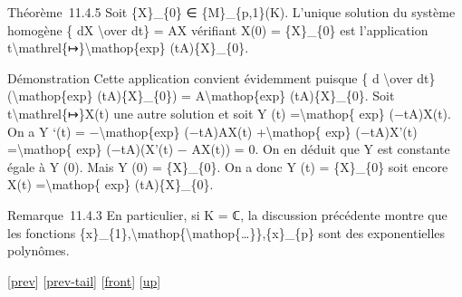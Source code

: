 \documentclass[]{article}
\begin{document}
Théorème~11.4.5 Soit \{X\}\_\{0\} ∈ \{M\}\_\{p,1\}(K). L'unique solution
du système homogène \{ dX \textbackslash{}over dt\} = AX vérifiant X(0)
= \{X\}\_\{0\} est l'application
t\textbackslash{}mathrel\{↦\}\textbackslash{}mathop\{exp\}
(tA)\{X\}\_\{0\}.

Démonstration Cette application convient évidemment puisque \{ d
\textbackslash{}over dt\} (\textbackslash{}mathop\{exp\}
(tA)\{X\}\_\{0\}) = A\textbackslash{}mathop\{exp\} (tA)\{X\}\_\{0\}.
Soit t\textbackslash{}mathrel\{↦\}X(t) une autre solution et soit Y (t)
=\textbackslash{}mathop\{ exp\} (−tA)X(t). On a Y `(t) =
−\textbackslash{}mathop\{exp\} (−tA)AX(t) +\textbackslash{}mathop\{
exp\} (−tA)X'(t) =\textbackslash{}mathop\{ exp\} (−tA)(X'(t) − AX(t)) =
0. On en déduit que Y est constante égale à Y (0). Mais Y (0) =
\{X\}\_\{0\}. On a donc Y (t) = \{X\}\_\{0\} soit encore X(t)
=\textbackslash{}mathop\{ exp\} (tA)\{X\}\_\{0\}.

Remarque~11.4.3 En particulier, si K = ℂ, la discussion précédente
montre que les fonctions
\{x\}\_\{1\},\textbackslash{}mathop\{\textbackslash{}mathop\{\ldots{}\}\},\{x\}\_\{p\}
sont des exponentielles polynômes.

{[}\href{coursse65.html}{prev}{]}
{[}\href{coursse65.html\#tailcoursse65.html}{prev-tail}{]}
{[}\href{coursse66.html}{front}{]}
{[}\href{coursch12.html\#coursse66.html}{up}{]}
\end{document}
